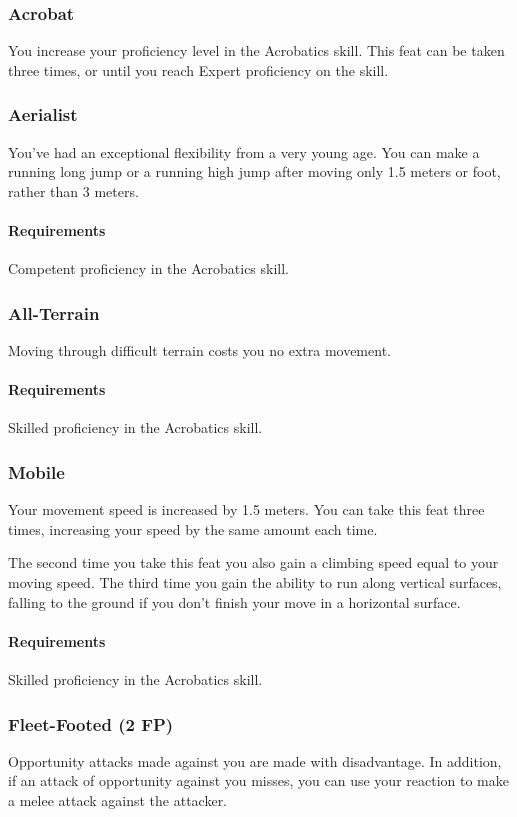 \subsubsection{Acrobat} \label{feat::acrobat}
    You increase your proficiency level in the Acrobatics skill.
    This feat can be taken three times, or until you reach Expert proficiency on the skill.
\subsubsection{Aerialist} \label{feat::aerialist}
    You've had an exceptional flexibility from a very young age.
    You can make a running long jump or a running high jump after moving only 1.5 meters or foot, rather than 3 meters.
    \paragraph{Requirements} Competent proficiency in the Acrobatics skill.
\subsubsection{All-Terrain} \label{feat::allterrain}
    Moving through difficult terrain costs you no extra movement.
    \paragraph{Requirements} Skilled proficiency in the Acrobatics skill.
\subsubsection{Mobile} \label{feat::mobile}
    Your movement speed is increased by 1.5 meters.
    You can take this feat three times, increasing your speed by the same amount each time.

    The second time you take this feat you also gain a climbing speed equal to your moving speed.
    The third time you gain the ability to run along vertical surfaces, falling to the ground if you don't finish your move in a horizontal surface.
    \paragraph{Requirements} Skilled proficiency in the Acrobatics skill.
\subsubsection{Fleet-Footed (2 FP)} \label{feat::fleetfooted}
    Opportunity attacks made against you are made with disadvantage.
    In addition, if an attack of opportunity against you misses, you can use your reaction to make a melee attack against the attacker.
